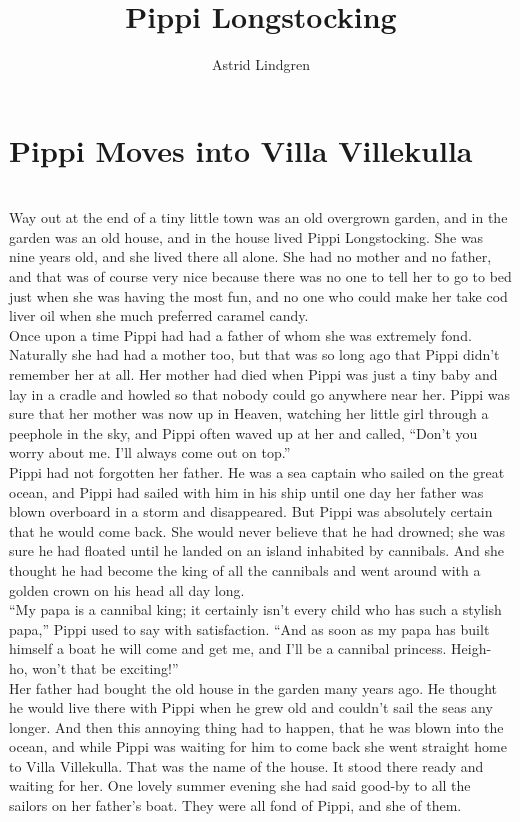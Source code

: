 \documentclass{standard}
\title{Pippi Longstocking}
\author{Astrid Lindgren}
\date{}
\begin{document}
\maketitle
\newpage

\section{Pippi Moves into Villa Villekulla}
\noindent\\

Way out at the end of a tiny little town was an old overgrown garden, and in the garden was an old house, and in the house lived Pippi Longstocking. She was nine years old, and she lived there all alone. She had no mother and no father, and that was of course very nice because there was no one to tell her to go to bed just when she was having the most fun, and no one who could make her take cod liver oil when she much preferred caramel candy.\\

Once upon a time Pippi had had a father of whom she was extremely fond. Naturally she had had a mother too, but that was so long ago that Pippi didn’t remember her at all. Her mother had died when Pippi was just a tiny baby and lay in a cradle and howled so that nobody could go anywhere near her. Pippi was sure that her mother was now up in Heaven, watching her little girl through a peephole in the sky, and Pippi often waved up at her and called, ``Don’t you worry about me. I’ll always come out on top.”\\

Pippi had not forgotten her father. He was a sea captain who sailed on the great ocean, and Pippi had sailed with him in his ship until one day her father was blown overboard in a storm and disappeared. But Pippi was absolutely certain that he would come back. She would never believe that he had drowned; she was sure he had floated until he landed on an island inhabited by cannibals. And she thought he had become the king of all the cannibals and went around with a golden crown on his head all day long.\\

``My papa is a cannibal king; it certainly isn’t every child who has such a stylish papa,” Pippi used to say with satisfaction. ``And as soon as my papa has built himself a boat he will come and get me, and I’ll be a cannibal princess. Heigh- ho, won’t that be exciting!”\\

Her father had bought the old house in the garden many years ago. He thought he would live there with Pippi when he grew old and couldn’t sail the seas any longer. And then this annoying thing had to happen, that he was blown into the ocean, and while Pippi was waiting for him to come back she went straight home to Villa Villekulla. That was the name of the house. It stood there ready and waiting for her. One lovely summer evening she had said good-by to all the sailors on her father’s boat. They were all fond of Pippi, and she of them.\\
\end{document}

